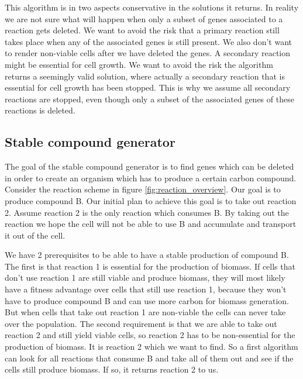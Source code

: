 \documentclass[12pt]{report}
\begin{document}
This algorithm is in two aspects conservative in the solutions it returns.
In reality we are not sure what will happen when only a subset of genes associated to a reaction gets deleted. We want to avoid the risk that a primary reaction still takes place when any of the associated genes is still present. We also don't want to render non-viable cells after we have deleted the genes. A secondary reaction might be essential for cell growth. We want to avoid the risk the algorithm returns a seemingly valid solution, where actually a secondary reaction that is essential for cell growth has been stopped. This is why we assume all secondary reactions are stopped, even though only a subset of the associated genes of these reactions is deleted.

\subsection{Stable compound generator}
The goal of the stable compound generator is to find genes which can be deleted in order to create an organism which has to produce a certain carbon compound. Consider the reaction scheme in figure \ref{fig:reaction_overview}. Our goal is to produce compound B. Our initial plan to achieve this goal is to take out reaction 2. Assume reaction 2 is the only reaction which consumes B. By taking out the reaction we hope the cell will not be able to use B and accumulate and transport it out of the cell.

We have 2 prerequisites to be able to have a stable production of compound B. The first is that reaction 1 is essential for the production of biomass. If cells that don't use reaction 1 are still viable and produce biomass, they will most likely have a fitness advantage over cells that still use reaction 1, because they won't have to produce compound B and can use more carbon for biomass generation. But when cells that take out reaction 1 are non-viable the cells can never take over the population.
The second requirement is that we are able to take out reaction 2 and still yield viable cells, so reaction 2 has to be non-essential for the production of biomass. It is reaction 2 which we want to find. So a first algorithm can look for all reactions that consume B and take all of them out and see if the cells still produce biomass. If so, it returns reaction 2 to us.
\end{document}
